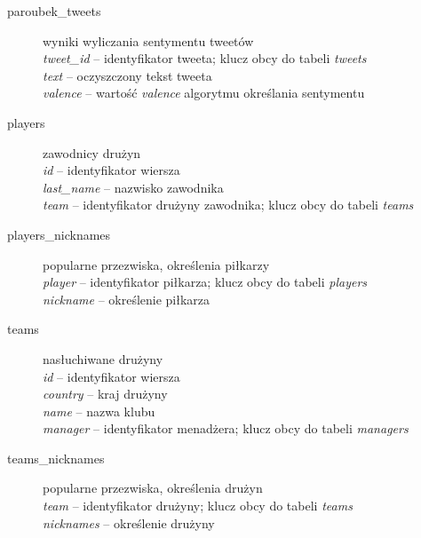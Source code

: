 \begin{description}
\item[paroubek\_tweets] wyniki wyliczania sentymentu tweetów \\
\textit{tweet\_id} -- identyfikator tweeta; klucz obcy do tabeli
\textit{tweets}\\
\textit{text} -- oczyszczony tekst tweeta\\
\textit{valence} -- wartość \textit{valence}  algorytmu określania
sentymentu\\

\item[players] zawodnicy drużyn \\
\textit{id} -- identyfikator wiersza \\
\textit{last\_name} -- nazwisko zawodnika\\
\textit{team} -- identyfikator drużyny zawodnika; klucz obcy do tabeli \textit{teams}\\
 
\item[players\_nicknames] popularne przezwiska, określenia piłkarzy\\
\textit{player} -- identyfikator piłkarza; klucz obcy do tabeli \textit{players}\\
\textit{nickname} -- określenie piłkarza\\
 
\item[teams] nasłuchiwane drużyny\\
\textit{id} -- identyfikator wiersza \\
\textit{country} -- kraj drużyny\\
\textit{name} -- nazwa klubu\\
\textit{manager} -- identyfikator menadżera; klucz obcy do tabeli
\textit{managers}\\
 
\item[teams\_nicknames] popularne przezwiska, określenia drużyn\\
\textit{team} -- identyfikator drużyny; klucz obcy do tabeli \textit{teams}\\
\textit{nicknames} -- określenie drużyny\\
 

\end{description}
